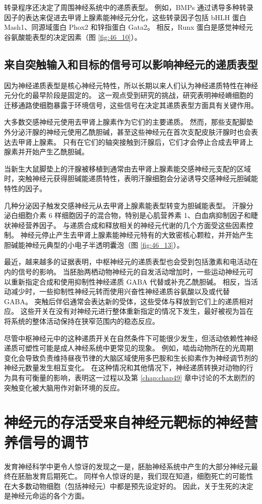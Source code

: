 转录程序还决定了周围神经系统中的递质表型。 例如，BMPs 通过诱导多种转录因子的表达来促进去甲肾上腺素能神经元分化，这些转录因子包括 bHLH 蛋白 Mash1、同源域蛋白 Phox2 和锌指蛋白 Gata2。 相反，Runx 蛋白是感觉神经元谷氨酸能表型的决定因素（图 \ref{fig:46_10}）。

\subsection{来自突触输入和目标的信号可以影响神经元的递质表型}
因为神经递质表型是核心神经元特性，所以长期以来人们认为神经递质特性在神经元分化的最早阶段是固定的。 这一观点受到研究的挑战，研究表明神经嵴细胞的迁移通路使细胞暴露于环境信号，这些信号在决定其递质表型方面具有关键作用。

大多数交感神经元使用去甲肾上腺素作为它们的主要递质。 然而，那些支配脚垫外分泌汗腺的神经元使用乙酰胆碱，甚至这些神经元在首次支配皮肤汗腺时也会表达去甲肾上腺素。 只有在它们的轴突接触到汗腺后，它们才会停止合成去甲肾上腺素并开始产生乙酰胆碱。

当新生大鼠脚垫上的汗腺被移植到通常由去甲肾上腺素能交感神经元支配的区域时，突触神经元获得胆碱能递质特性，表明汗腺细胞会分泌诱导交感神经元胆碱能特性的因子。

几种分泌因子触发交感神经元从去甲肾上腺素能表型转变为胆碱能表型。 汗腺分泌白细胞介素 6 样细胞因子的混合物，特别是心肌营养素 1、白血病抑制因子和睫状神经营养因子。 与递质合成和释放相关的神经元代谢的几个方面受这些因素控制。 神经元停止产生去甲肾上腺素能神经元特有的大致密核心颗粒，并开始产生胆碱能神经元典型的小电子半透明囊泡（图 \ref{fig:46_13}）。

最近，越来越多的证据表明，中枢神经元的递质表型也会受到包括激素和电活动在内的信号的影响。 当胚胎两栖动物神经元的自发活动增加时，一些运动神经元可以重新指定合成和使用抑制性神经递质 GABA 代替或补充乙酰胆碱。 相反，当活动减少时，一些抑制性神经元转而使用兴奋性神经递质谷氨酸以及或代替 GABA。 突触后伴侣通常会表达新的受体，这些受体与释放到它们上的递质相对应。 这些开关在没有对神经元进行整体重新指定的情况下发生，最好被视为旨在将系统的整体活动保持在狭窄范围内的稳态反应。

尽管中枢神经元中的这种递质开关在自然条件下可能很少发生，但活动依赖性神经递质可塑性可能是成人神经系统中更常见的现象。 例如，啮齿动物所在的光周期变化会导致负责维持昼夜节律的大脑区域使用多巴胺和生长抑素作为神经调节剂的神经元数量发生相互变化。 在这种情况和其他情况下，神经递质转换对动物的行为具有可衡量的影响，表明这一过程以及第 \ref{chap:chap49} 章中讨论的不太剧烈的突触变化被大脑用作对新环境的反应。


\section{神经元的存活受来自神经元靶标的神经营养信号的调节}
发育神经科学中更令人惊讶的发现之一是，胚胎神经系统中产生的大部分神经元最终在胚胎发育后期死亡。 同样令人惊讶的是，我们现在知道，细胞死亡的可能性在大多数动物细胞（包括神经元）中都是预先设定好的。 因此，关于生死的决定是神经元命运的各个方面。

